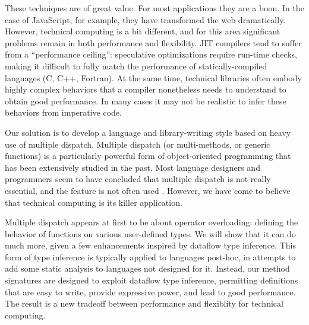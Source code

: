 \documentclass[12pt]{article}
\begin{document}
These techniques are of great value. For most applications they are a boon.
In the case of JavaScript, for example, they have transformed the web
dramatically. However, technical computing is a bit different, and for
this area significant problems remain in both performance and flexibility.
JIT compilers tend to suffer from a ``performance ceiling'': speculative
optimizations require run-time checks, making it difficult to fully match
the performance of statically-compiled languages (C, C++, Fortran).
At the same time, technical libraries often embody highly complex behaviors
that a compiler nonetheless needs to understand to obtain good
performance. In many cases it may not be realistic to infer these behaviors
from imperative code.

Our solution is to develop a language and library-writing style based on
heavy use of multiple dispatch. Multiple dispatch (or multi-methods, or
generic functions) is a particularly powerful form of object-oriented
programming that has been extensively studied in the past.
Most language designers and programmers seem to have concluded that
multiple dispatch is not really essential, and the feature is not often used
\cite{multipledispatch}. However, we have come to believe that
technical computing is its killer application.

Multiple dispatch appears at first to be about operator overloading:
defining the behavior of functions on various user-defined types.
We will show that it can do much more, given a few enhancements inspired
by dataflow type inference. This form of type inference is typically
applied to languages post-hoc, in attempts to add some static analysis
to languages not designed for it. Instead, our method signatures are
designed to exploit dataflow type inference, permitting definitions
that are easy to write, provide expressive power, and lead to
good performance. The result is a new tradeoff between performance
and flexiblity for technical computing.




\end{document}
